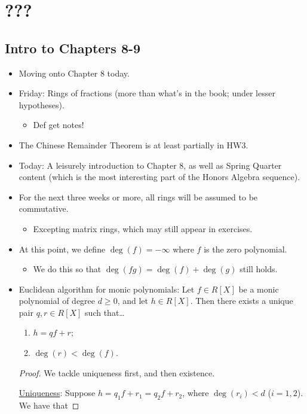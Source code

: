 \documentclass[../notes.tex]{subfiles}
\begin{document}
\chapter{???}
\section{Intro to Chapters 8-9}
\begin{itemize}
    \item {}Moving onto Chapter 8 today.
    \item Friday: Rings of fractions (more than what's in the book; under lesser hypotheses).
    \begin{itemize}
        \item Def get notes!
    \end{itemize}
    \item The Chinese Remainder Theorem is at least partially in HW3.
    \item Today: A leisurely introduction to Chapter 8, as well as Spring Quarter content (which is the most interesting part of the Honors Algebra sequence).
    \item For the next three weeks or more, all rings will be assumed to be commutative.
    \begin{itemize}
        \item Excepting matrix rings, which may still appear in exercises.
    \end{itemize}
    \item At this point, we define $\deg(f)=-\infty$ where $f$ is the zero polynomial.
    \begin{itemize}
        \item We do this so that $\deg(fg)=\deg(f)+\deg(g)$ still holds.
    \end{itemize}
    \item Euclidean algorithm for monic polynomials: Let $f\in R[X]$ be a monic polynomial of degree $d\geq 0$, and let $h\in R[X]$. Then there exists a unique pair $q,r\in R[X]$ such that\dots
    \begin{enumerate}
        \item $h=qf+r$;
        \item $\deg(r)<\deg(f)$.
    \end{enumerate}
    \begin{proof}
        We tackle uniqueness first, and then existence.\par
        \underline{Uniqueness}: Suppose $h=q_1f+r_1=q_2f+r_2$, where $\deg(r_i)<d$ ($i=1,2$). We have that

\end{proof}
\end{itemize}
\end{document}
